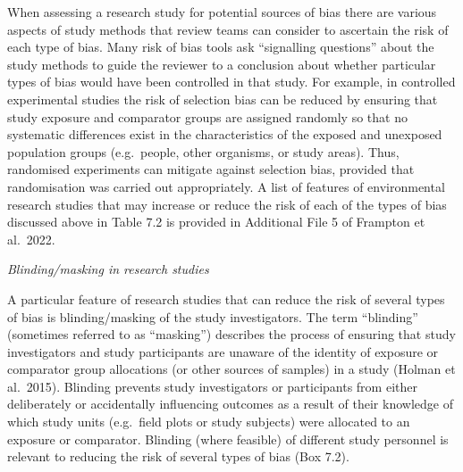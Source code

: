 \documentclass[
  letterpaper,
  DIV=11,
  numbers=noendperiod]{scrreprt}
\begin{document}
When assessing a research study for potential sources of bias there are
various aspects of study methods that review teams can consider to
ascertain the risk of each type of bias. Many risk of bias tools ask
``signalling questions'' about the study methods to guide the reviewer
to a conclusion about whether particular types of bias would have been
controlled in that study. For example, in controlled experimental
studies the risk of selection bias can be reduced by ensuring that study
exposure and comparator groups are assigned randomly so that no
systematic differences exist in the characteristics of the exposed and
unexposed population groups (e.g.~people, other organisms, or study
areas). Thus, randomised experiments can mitigate against selection
bias, provided that randomisation was carried out appropriately. A list
of features of environmental research studies that may increase or
reduce the risk of each of the types of bias discussed above in Table
7.2 is provided in Additional File 5 of Frampton et al.~2022.

\emph{Blinding/masking in research studies}

A particular feature of research studies that can reduce the risk of
several types of bias is blinding/masking of the study investigators.
The term ``blinding'' (sometimes referred to as ``masking'') describes
the process of ensuring that study investigators and study participants
are unaware of the identity of exposure or comparator group allocations
(or other sources of samples) in a study (Holman et al.~2015). Blinding
prevents study investigators or participants from either deliberately or
accidentally influencing outcomes as a result of their knowledge of
which study units (e.g.~field plots or study subjects) were allocated to
an exposure or comparator. Blinding (where feasible) of different study
personnel is relevant to reducing the risk of several types of bias (Box
7.2).
\end{document}
